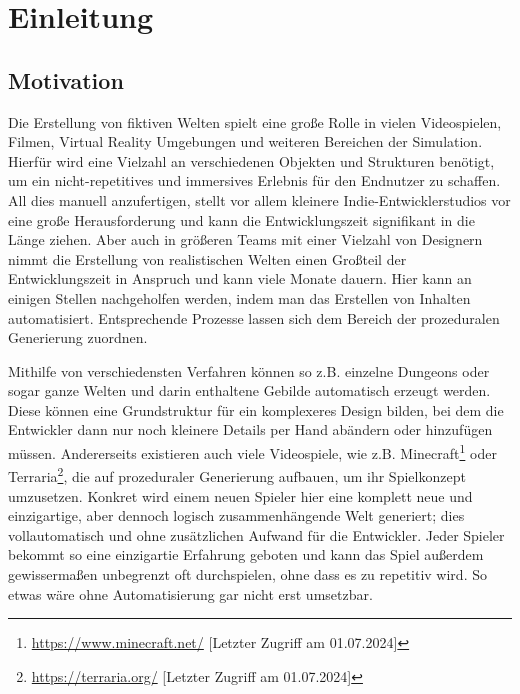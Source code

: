 %
\chapter{Einleitung}

\section{Motivation}
Die Erstellung von fiktiven Welten spielt eine große Rolle in vielen Videospielen, Filmen, Virtual Reality Umgebungen
und weiteren Bereichen der Simulation. Hierfür wird eine Vielzahl an verschiedenen Objekten und Strukturen benötigt, um
ein nicht-repetitives und immersives Erlebnis für den Endnutzer zu schaffen. All dies manuell anzufertigen, stellt vor
allem kleinere Indie-Entwicklerstudios vor eine große Herausforderung und kann die Entwicklungszeit signifikant in die
Länge ziehen. Aber auch in größeren Teams mit einer Vielzahl von Designern nimmt die Erstellung von realistischen Welten einen
Großteil der Entwicklungszeit in Anspruch und kann viele Monate dauern. \cite{10_freiknecht} Hier kann an einigen Stellen
nachgeholfen werden, indem man das Erstellen von Inhalten automatisiert. Entsprechende Prozesse lassen sich dem Bereich
der prozeduralen Generierung zuordnen.

Mithilfe von verschiedensten Verfahren können so z.B. einzelne Dungeons oder sogar ganze Welten und darin enthaltene Gebilde
automatisch erzeugt werden. Diese können eine Grundstruktur für ein komplexeres Design bilden, bei dem die Entwickler dann nur noch
kleinere Details per Hand abändern oder hinzufügen müssen. \cite{10_freiknecht} Andererseits existieren auch viele Videospiele,
wie z.B. Minecraft\footnote{\url{https://www.minecraft.net/} [Letzter Zugriff am 01.07.2024]} oder Terraria\footnote{
\url{https://terraria.org/} [Letzter Zugriff am 01.07.2024]}, die auf prozeduraler
Generierung aufbauen, um ihr Spielkonzept umzusetzen. Konkret wird einem neuen Spieler hier eine komplett neue und einzigartige,
aber dennoch logisch zusammenhängende Welt generiert; dies vollautomatisch und ohne zusätzlichen Aufwand für die Entwickler. Jeder
Spieler bekommt so eine einzigartie Erfahrung geboten und kann das Spiel außerdem gewissermaßen unbegrenzt oft durchspielen, ohne
dass es zu repetitiv wird. So etwas wäre ohne Automatisierung gar nicht erst umsetzbar.

